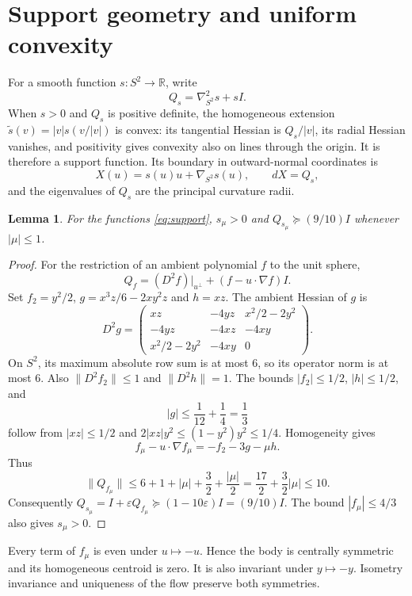 \documentclass[11pt,a4paper]{article}
\newtheorem{lemma}[theorem]{Lemma}
\theoremstyle{remark}\newtheorem{remark}[theorem]{Remark}
\newcommand{\R}{\mathbb R}\newcommand{\E}{\mathbb E}\newcommand{\Prob}{\mathbb P}
\begin{document}
\section{Support geometry and uniform convexity}
For a smooth function \(s:S^2\to\R\), write
\[
 Q_s=\nabla^2_{S^2}s+sI.
\]
When \(s>0\) and \(Q_s\) is positive definite, the homogeneous extension \(\widetilde s(v)=|v|s(v/|v|)\) is convex: its tangential Hessian is \(Q_s/|v|\), its radial Hessian vanishes, and positivity gives convexity also on lines through the origin. It is therefore a support function. Its boundary in outward-normal coordinates is
\begin{equation}\label{eq:normalparam}
 X(u)=s(u)u+\nabla_{S^2}s(u),\qquad dX=Q_s,
\end{equation}
and the eigenvalues of \(Q_s\) are the principal curvature radii.

\begin{lemma}\label{lem:convex}
For the functions \eqref{eq:support}, \(s_\mu>0\) and \(Q_{s_\mu}\succeq(9/10)I\) whenever \(|\mu|\le1\).
\end{lemma}
\begin{proof}
For the restriction of an ambient polynomial \(f\) to the unit sphere,
\[
 Q_f=(D^2 f)|_{u^\perp}+(f-u\cdot\nabla f)I.
\]
Set \(f_2=y^2/2\), \(g=x^3z/6-2xy^2z\) and \(h=xz\). The ambient Hessian of \(g\) is
\[
 D^2g=\begin{pmatrix}
 xz&-4yz&x^2/2-2y^2\\
 -4yz&-4xz&-4xy\\
 x^2/2-2y^2&-4xy&0
 \end{pmatrix}.
\]
On \(S^2\), its maximum absolute row sum is at most 6, so its operator norm is at most 6. Also \(\|D^2f_2\|\le1\) and \(\|D^2h\|=1\). The bounds \(|f_2|\le1/2\), \(|h|\le1/2\), and
\[
 |g|\le\frac1{12}+\frac14=\frac13
\]
follow from \(|xz|\le1/2\) and \(2|xz|y^2\le(1-y^2)y^2\le1/4\). Homogeneity gives
\[
 f_\mu-u\cdot\nabla f_\mu=-f_2-3g-\mu h.
\]
Thus
\[
 \|Q_{f_\mu}\|\le 6+1+|\mu|+\frac32+\frac{|\mu|}{2}
 =\frac{17}{2}+\frac32|\mu|\le10.
\]
Consequently \(Q_{s_\mu}=I+\varepsilon Q_{f_\mu}\succeq(1-10\varepsilon)I=(9/10)I\). The bound \(|f_\mu|\le4/3\) also gives \(s_\mu>0\).
\end{proof}

Every term of \(f_\mu\) is even under \(u\mapsto-u\). Hence the body is centrally symmetric and its homogeneous centroid is zero. It is also invariant under \(y\mapsto-y\). Isometry invariance and uniqueness of the flow preserve both symmetries.
\end{document}
